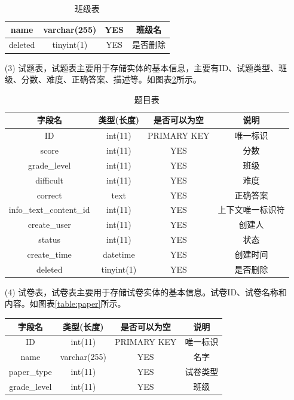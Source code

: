 \begin{enumerate}
\begin{table}[!htbp]
\begin{tabular}{|c|c|c|c|}
			\hline
			name & varchar(255) & YES & 班级名 \\
			\hline
			deleted & tinyint(1) & YES & 是否删除 \\
			\hline
		\end{tabular}
		\caption{班级表}
		\label{table:class}
	\end{table}
	\item[(3)] 试题表，试题表主要用于存储实体的基本信息，主要有ID、试题类型、班级、分数、难度、正确答案、描述等。如图表\ref{table:question}所示。
	\begin{table}[!htbp]
		\centering
		\begin{tabular}{|c|c|c|c|}
			\hline
			字段名 & 类型(长度) & 是否可以为空 & 说明 \\
			\hline
			ID & int(11) & PRIMARY KEY & 唯一标识 \\
			\hline
			score & int(11) & YES & 分数 \\
			\hline
			grade\_level & int(11) & YES & 班级 \\
			\hline
			difficult & int(11) & YES & 难度 \\
			\hline
			correct & text & YES & 正确答案 \\
			\hline
			info\_text\_content\_id & int(11) & YES & 上下文唯一标识符 \\
			\hline
			create\_user & int(11) & YES & 创建人 \\
			\hline
			status & int(11) & YES & 状态 \\
			\hline
			create\_time & datetime & YES & 创建时间 \\
			\hline
			deleted & tinyint(1) & YES & 是否删除 \\
			\hline
		\end{tabular}
		\caption{题目表}
		\label{table:question}
	\end{table}
	\item[(4)] 试卷表，试卷表主要用于存储试卷实体的基本信息。试卷ID、试卷名称和内容。如图表\ref{table:paper}所示。
	\begin{table}[!htbp]
		\centering
		\begin{tabular}{|c|c|c|c|}
			\hline
			字段名 & 类型(长度) & 是否可以为空 & 说明 \\
			\hline
			ID & int(11) & PRIMARY KEY & 唯一标识 \\
			\hline
			name & varchar(255) & YES & 名字 \\
			\hline
			paper\_type & int(11) & YES & 试卷类型 \\
			\hline
			grade\_level & int(11) & YES & 班级 \\

\end{tabular}
\end{table}
\end{enumerate}
